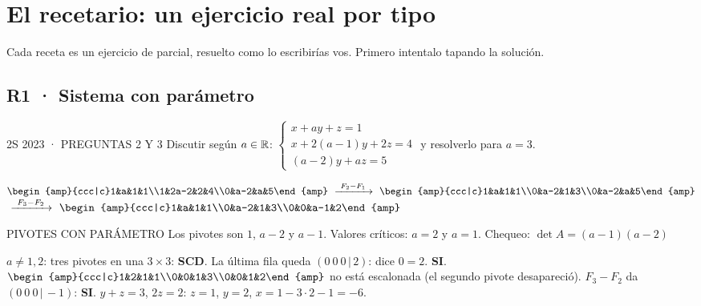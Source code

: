 \chapter{El recetario: un ejercicio real por tipo}
Cada receta es un ejercicio de parcial, resuelto como lo escribirías vos. Primero intentalo tapando la solución.

\section*{R1 · Sistema con parámetro}
\begin{enunciado}{2S 2023 · PREGUNTAS 2 Y 3}
Discutir según $a\in\mathbb{R}$: \quad $\left\{\begin{array}{l}x+ay+z=1\\x+2(a-1)y+2z=4\\(a-2)y+az=5\end{array}\right.$ \quad y resolverlo para $a=3$.
\end{enunciado}
$\begin{amp}{ccc|c}1&a&1&1\\1&2a-2&2&4\\0&a-2&a&5\end{amp}
\op{F_2-F_1}
\begin{amp}{ccc|c}1&a&1&1\\0&a-2&1&3\\0&a-2&a&5\end{amp}$\\[4pt]
\hspace*{25mm}$\op{F_3-F_2}
\begin{amp}{ccc|c}1&a&1&1\\0&a-2&1&3\\0&0&a-1&2\end{amp}$
\begin{uso}{PIVOTES CON PARÁMETRO}
Los pivotes son $1$, $a-2$ y $a-1$. Valores críticos: $a=2$ y $a=1$. Chequeo: $\det A=(a-1)(a-2)$\ok
\end{uso}
$a\neq1,2$: tres pivotes en una $3\times3$: \textbf{SCD}.
La última fila queda $(0\ 0\ 0\,|\,2)$: dice $0=2$. \textbf{SI}.
$\begin{amp}{ccc|c}1&2&1&1\\0&0&1&3\\0&0&1&2\end{amp}$ no está escalonada (el segundo pivote desapareció). $F_3-F_2$ da $(0\ 0\ 0\,|\,-1)$: \textbf{SI}.
$y+z=3$, $2z=2$: $z=1$, $y=2$, $x=1-3\cdot2-1=-6$.

